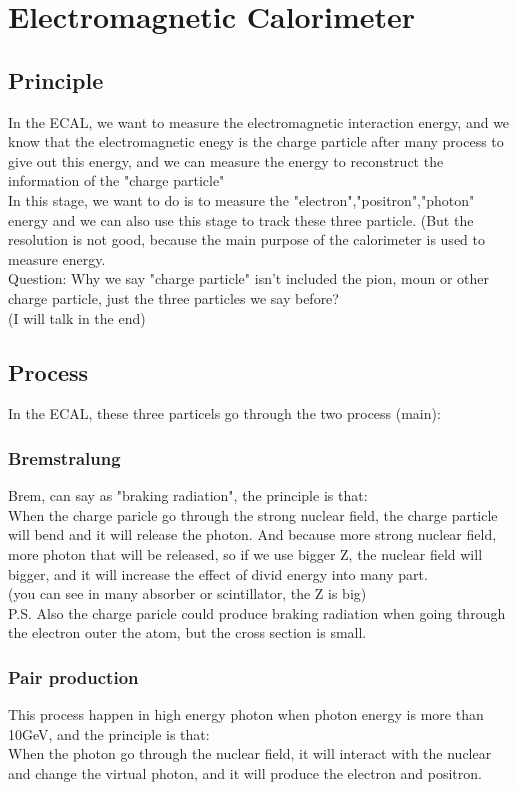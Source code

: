 \documentclass[12pt]{article}
\begin{document}
\section{Electromagnetic Calorimeter}

\subsection{Principle}
In the ECAL, we want to measure the electromagnetic interaction energy, and we know that the electromagnetic enegy is the charge particle after many process to give out this energy, and we can measure the energy to reconstruct the information of the "charge particle"\\
In this stage, we want to do is to measure the "electron","positron","photon"
energy and we can also use this stage to track these three particle. (But the resolution is not good, because the main purpose of the calorimeter is used to measure energy.\\
Question: Why we say "charge particle" isn't included the pion, moun or other charge particle, just the three particles we say before?\\
(I will talk in the end)\\

\subsection{Process}
In the ECAL, these three particels go through the two process (main):
\subsubsection{Bremstralung}
Brem, can say as "braking radiation", the principle is that:\\
When the charge paricle go through the strong nuclear field, the charge particle will bend and it will release the photon. And because more strong nuclear field, more photon that will be released, so if we use bigger Z, the nuclear field will bigger, and it will increase the effect of divid energy into many part.\\
(you can see in many absorber or scintillator, the Z is big)\\
P.S. Also the charge paricle could produce braking radiation when going through the electron outer the atom, but the cross section is small.\\
\subsubsection{Pair production}
This process happen in high energy photon when photon energy is more than 10GeV, and the principle is that:\\
When the photon go through the nuclear field, it will interact with the nuclear and change the virtual photon, and it will produce the electron and positron.
\end{document}
